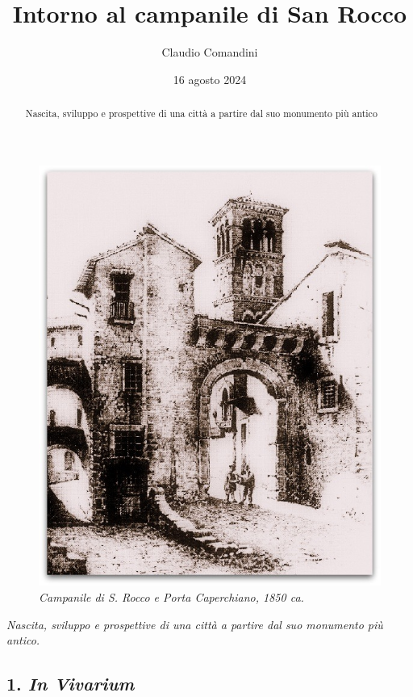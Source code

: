 \documentclass[
  letterpaper,
  DIV=11,
  numbers=noendperiod]{scrartcl}
\title{Intorno al campanile di San Rocco}
\author{Claudio Comandini}
\date{16 agosto 2024}
\begin{document}
\maketitle
\begin{abstract}
Nascita, sviluppo e prospettive di una città a partire dal suo monumento
più antico
\end{abstract}

\begin{figure}[H]

{\centering \includegraphics{../../images/2024/san_rocco/1CampanileSRoccoPortaCapestrano.jpg}

}

\caption{\emph{Campanile di S. Rocco e Porta Caperchiano, 1850 ca.}}

\end{figure}%

\emph{Nascita, sviluppo e prospettive di una città a partire dal suo
monumento più antico.}

\subsection{\texorpdfstring{1. \emph{In
Vivarium}}{1. In Vivarium}}\label{in-vivarium}
\end{document}
